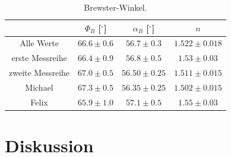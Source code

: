 \documentclass[12pt,a4paper,titlepage,headinclude,bibtotoc]{scrartcl}
\begin{document}
\begin{table}[!htb]
\centering
\begin{tabular}{|c|c|c|c|}
         \hline
         & $\Phi_B$ [$^\circ$] & $\alpha_B$ [$^\circ$] & $n$ \\
         \hline
         Alle Werte & $66.6 \pm 0.6$ & $56.7 \pm 0.3$ & $1.522 \pm 0.018$ \\
         erste Messreihe & $66.4 \pm 0.9$ & $56.8 \pm 0.5$ & $1.53 \pm 0.03$ \\
         zweite Messreihe & $67.0 \pm 0.5$ & $56.50 \pm 0.25$ & $1.511 \pm 0.015$ \\
         \hline
         Michael & $67.3 \pm 0.5$ & $56.35 \pm 0.25$ & $1.502 \pm 0.015$ \\
         Felix & $65.9 \pm 1.0$ & $57.1 \pm 0.5$ & $1.55 \pm 0.03$ \\
         \hline
\end{tabular}
\caption{Brewster-Winkel.}
\label{tab:brewster}
\end{table}



\section{Diskussion}
\label{sec:diskussion}


 
 
\end{document}
